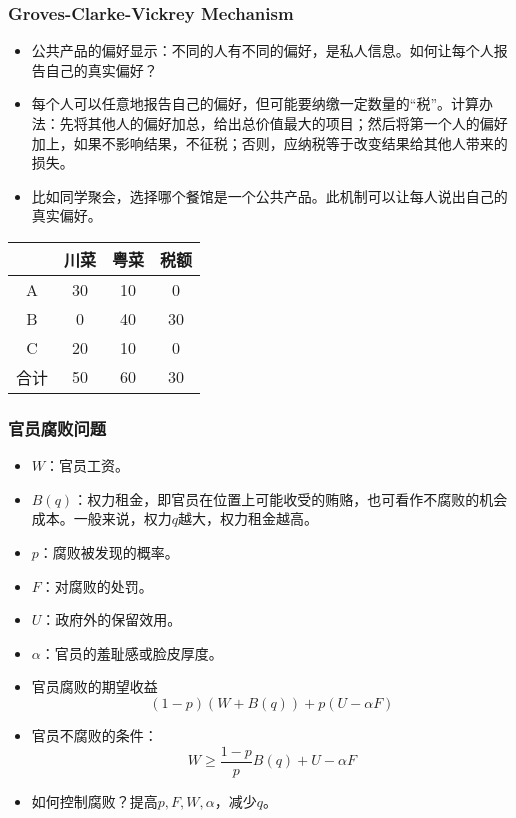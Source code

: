 \documentclass[UTF8,11pt,colorlinks,compress,openany]{beamer}%
\begin{document}
\begin{frame}\frametitle{Groves-Clarke-Vickrey Mechanism}
\begin{itemize}
	\item 公共产品的偏好显示：不同的人有不同的偏好，是私人信息。如何让每个人报告自己的真实偏好？
	\item 每个人可以任意地报告自己的偏好，但可能要纳缴一定数量的“税”。计算办法：先将其他人的偏好加总，给出总价值最大的项目；然后将第一个人的偏好加上，如果不影响结果，不征税；否则，应纳税等于改变结果给其他人带来的损失。
	\item 比如同学聚会，选择哪个餐馆是一个公共产品。此机制可以让每人说出自己的真实偏好。
\end{itemize}
\begin{table}
\begin{tabu}{c|c|c|c}
\hline
	& 川菜 & 粤菜 & 税额 \\
\hline
A & 30 & 10 & 0 \\
B & 0 & 40 & 30 \\
C & 20 & 10 & 0 \\
\hline
合计 & 50 & 60 & 30\\
\hline
\end{tabu}
\end{table}
\end{frame}

\begin{frame}\frametitle{官员腐败问题}
\begin{itemize}
	\item $W$：官员工资。
	\item $B(q)$：权力租金，即官员在位置上可能收受的贿赂，也可看作不腐败的机会成本。一般来说，权力$q$越大，权力租金越高。
	\item $p$：腐败被发现的概率。
	\item $F$：对腐败的处罚。
	\item $U$：政府外的保留效用。
	\item $\alpha$：官员的羞耻感或脸皮厚度。
	\item 官员腐败的期望收益
	\[(1-p)(W+B(q))+p(U-\alpha F)\]
	\item 官员不腐败的条件：
	\[W\geq \frac{1-p}{p}B(q)+U-\alpha F\]
	\item 如何控制腐败？提高$p,F,W,\alpha$，减少$q$。
\end{itemize}
\end{frame}
\end{document}
